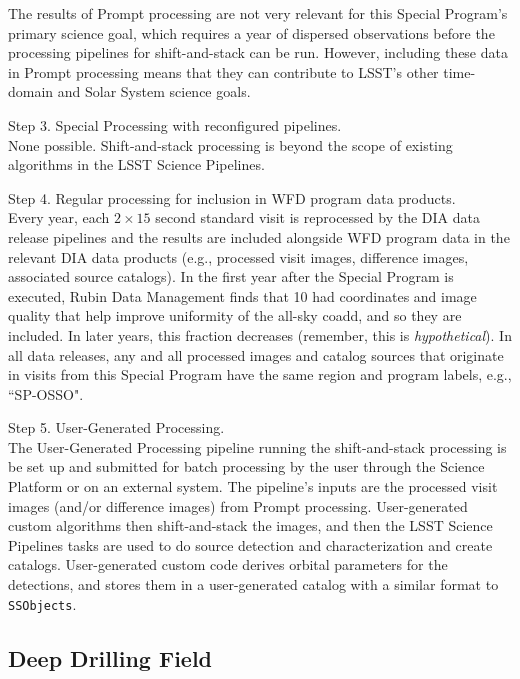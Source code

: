 The results of Prompt processing are not very relevant for this Special Program's primary science goal,
which requires a year of dispersed observations before the processing pipelines for shift-and-stack can be run.
However, including these data in Prompt processing means that
they can contribute to LSST's other time-domain and Solar System science goals.

Step 3. Special Processing with reconfigured pipelines. \\
None possible. 
Shift-and-stack processing is beyond the scope of existing algorithms in the LSST Science Pipelines.

Step 4. Regular processing for inclusion in WFD program data products. \\
Every year, each $2\times15$ second standard visit is reprocessed by the DIA data release pipelines
and the results are included alongside WFD program data in the relevant DIA data products
(e.g., processed visit images, difference images, associated source catalogs).
In the first year after the Special Program is executed,
Rubin Data Management finds that 10%
had coordinates and image quality that help improve uniformity of the all-sky coadd,
and so they are included.
In later years, this fraction decreases (remember, this is \emph{hypothetical}).
In all data releases, any and all processed images and catalog sources that originate in visits from this Special Program
have the same region and program labels, e.g., ``SP-OSSO".

Step 5. User-Generated Processing. \\
The User-Generated Processing pipeline running the shift-and-stack processing is be set up and submitted 
for batch processing by the user through the Science Platform or on an external system. 
The pipeline's inputs are the processed visit images (and/or difference images) from Prompt processing.
User-generated custom algorithms then shift-and-stack the images, and then the LSST Science Pipelines
tasks are used to do source detection and characterization and create catalogs.
User-generated custom code derives orbital parameters for the detections, and stores
them in a user-generated catalog with a similar format to {\tt SSObjects}.


\subsection{Deep Drilling Field}\label{ssec:SPCS_SNDDF}

